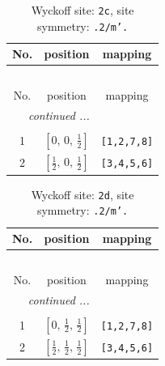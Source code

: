 \documentclass[fleqn,8pt]{jsarticle}
\begin{document}
\begin{longtable}{ccc}
\caption{Wyckoff site: {\tt 2c}, site symmetry: {\tt .2/m'.}}
 \\
 \hline \hline
No. & position & mapping \\ \hline \endfirsthead

\multicolumn{2}{l}{\tablename\ \thetable{}} \\
 \hline \hline
No. & position & mapping \\ \hline \endhead

 \hline \hline
\multicolumn{2}{r}{\footnotesize\it continued ...} \\ \endfoot

 \hline \hline
\multicolumn{2}{r}{} \\ \endlastfoot

1 & $\left[ 0,\, 0,\, \frac{1}{2} \right]$ & {\tt [1,2,7,8]} \\ \hline
2 & $\left[ \frac{1}{2},\, 0,\, \frac{1}{2} \right]$ & {\tt [3,4,5,6]} \\
\end{longtable}
\renewcommand{\arraystretch}{1.2}
\begin{longtable}{ccc}
\caption{Wyckoff site: {\tt 2d}, site symmetry: {\tt .2/m'.}}
 \\
 \hline \hline
No. & position & mapping \\ \hline \endfirsthead

\multicolumn{2}{l}{\tablename\ \thetable{}} \\
 \hline \hline
No. & position & mapping \\ \hline \endhead

 \hline \hline
\multicolumn{2}{r}{\footnotesize\it continued ...} \\ \endfoot

 \hline \hline
\multicolumn{2}{r}{} \\ \endlastfoot

1 & $\left[ 0,\, \frac{1}{2},\, \frac{1}{2} \right]$ & {\tt [1,2,7,8]} \\ \hline
2 & $\left[ \frac{1}{2},\, \frac{1}{2},\, \frac{1}{2} \right]$ & {\tt [3,4,5,6]} \\
\end{longtable}
\renewcommand{\arraystretch}{1.2}
\end{document}
